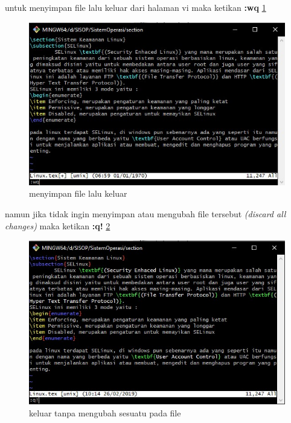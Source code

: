 \begin{enumerate}
\subitem untuk menyimpan file lalu keluar dari halaman vi maka ketikan \textbf{:wq} \ref{wq}
\begin{figure}[!htbp]
\centerline{\includegraphics[width=.75\textwidth]{Figures/vi4.jpg}}
\caption{menyimpan file lalu keluar}
\label{wq}
\end{figure}

\subitem namun jika tidak ingin menyimpan atau mengubah file tersebut \textit{(discard all changes)} maka ketikan \textbf{:q!} \ref{q}
\begin{figure}[!htbp]
\centerline{\includegraphics[width=.75\textwidth]{Figures/vi(q).jpg}}
\caption{keluar tanpa mengubah sesuatu pada file}
\label{q}
\end{figure}
\end{enumerate}